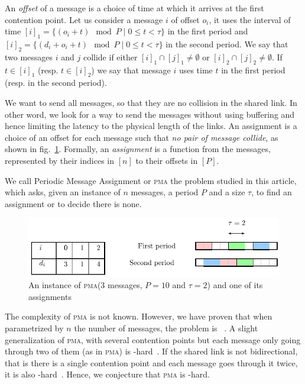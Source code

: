 \documentclass[10pt, conference, letterpaper]{IEEEtran}
\newcommand\pma{\textsc{pma}\xspace}
\begin{document}
An \emph{offset} of a message is a choice of time at which it arrives
at the first contention point. Let us consider a message $i$
of offset $o_i$, it uses the interval of time $[i]_1 = \{ (o_i + t) \mod P \mid 0 \leq t < \tau \}$ in the first period and $[i]_2 = \{ (d_i + o_i + t) \mod P \mid 0 \leq t < \tau \}$ in the second period. We say that two messages $i$ and $j$ collide if either $[i]_1 \cap [j]_1 \neq \emptyset $ or $[i]_2 \cap [j]_2 \neq \emptyset $. If $t \in [i]_1$ (resp. $t \in [i]_2$) we say that message $i$ uses time $t$ in the first period (resp. in the second period).

We want to send all messages, so that they are no collision in the shared link.
In other word, we look for a way to send the messages without using buffering and 
hence limiting the latency to the physical length of the links. An assignment is a
choice of an offset for each message such that \emph{no pair of message collide}, as shown in fig.~\ref{fig:assignment}.
Formally, an \emph{assignment} is a function from the messages, represented by their indices in $[n]$ to their offsets in $[P]$.  

We call Periodic Message Assignment or \pma the problem studied in this article,
which asks, given an instance of $n$ messages, a period $P$ and a size $\tau$, to find 
an assignment or to decide there is none.
\begin{figure}
\begin{center}
\includegraphics[scale=0.7]{instance}
\end{center}
\caption{An instance of \pma ($3$ messages, $P= 10$ and $\tau = 2$) and one of its assignments}
\label{fig:assignment}
\end{figure}

The complexity of \pma is not known. However, we have proven that when parametrized by
$n$ the number of messages, the problem is \FPT~\cite{barth2018deterministic}.
A slight generalization of \pma, with several contention points but each message only going through two of them (as in \pma) is \NP-hard~\cite{barth2018deterministic}. If the shared link is not bidirectional, that is there is a single contention point and each message goes through it twice, it is also \NP-hard~\cite{orman1997complexity}. Hence, we conjecture that \pma is \NP-hard.
\end{document}
